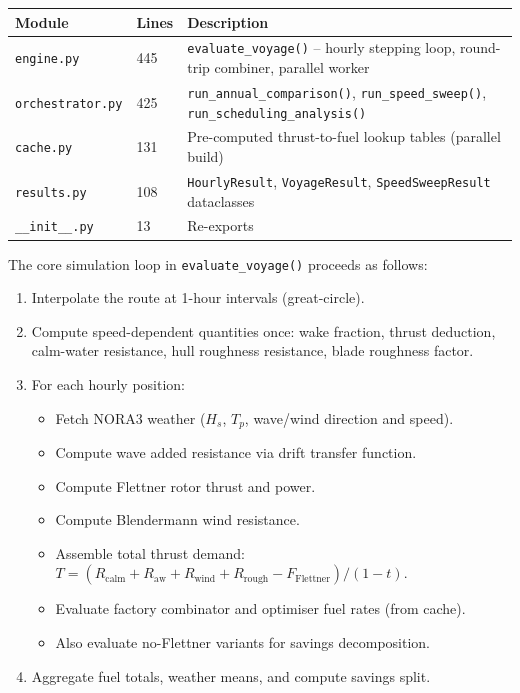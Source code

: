 \documentclass[a4paper,11pt]{article}
\begin{document}
\begin{center}
\begin{tabular}{llp{8cm}}
\toprule
Module & Lines & Description\\[0pt]
\midrule
\texttt{engine.py} & 445 & \texttt{evaluate\_voyage()} -- hourly stepping loop, round-trip combiner, parallel worker\\[0pt]
\texttt{orchestrator.py} & 425 & \texttt{run\_annual\_comparison()}, \texttt{run\_speed\_sweep()}, \texttt{run\_scheduling\_analysis()}\\[0pt]
\texttt{cache.py} & 131 & Pre-computed thrust-to-fuel lookup tables (parallel build)\\[0pt]
\texttt{results.py} & 108 & \texttt{HourlyResult}, \texttt{VoyageResult}, \texttt{SpeedSweepResult} dataclasses\\[0pt]
\texttt{\_\_init\_\_.py} & 13 & Re-exports\\[0pt]
\bottomrule
\end{tabular}
\end{center}

The core simulation loop in \texttt{evaluate\_voyage()} proceeds as follows:

\begin{enumerate}
\item Interpolate the route at 1-hour intervals (great-circle).
\item Compute speed-dependent quantities once: wake fraction, thrust deduction,
calm-water resistance, hull roughness resistance, blade roughness factor.
\item For each hourly position:
\begin{itemize}
\item Fetch NORA3 weather (\(H_s\), \(T_p\), wave/wind direction and speed).
\item Compute wave added resistance via drift transfer function.
\item Compute Flettner rotor thrust and power.
\item Compute Blendermann wind resistance.
\item Assemble total thrust demand: \(T = (R_\text{calm} + R_\text{aw} + R_\text{wind} + R_\text{rough} - F_\text{Flettner}) / (1 - t)\).
\item Evaluate factory combinator and optimiser fuel rates (from cache).
\item Also evaluate no-Flettner variants for savings decomposition.
\end{itemize}
\item Aggregate fuel totals, weather means, and compute savings split.
\end{enumerate}
\end{document}
